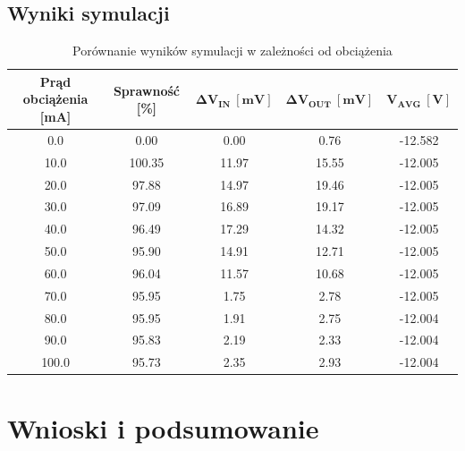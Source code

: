 \documentclass[11pt]{article}
\begin{document}
\subsection{Wyniki symulacji}
\begin{table}[H]
    \centering
    \caption{Porównanie wyników symulacji w zależności od obciążenia}
    \label{tab:efficiency_ripple}
    \begin{tabular}{ccccc}
        \toprule
        \textbf{Prąd obciążenia [mA]} & \textbf{Sprawność [\%]} & $\mathbf{\Delta{V_{IN}} \ [mV]}$ & $\mathbf{\Delta{V_{OUT}} \ [mV]}$ & $\mathbf{V_{AVG} \ [V]}$ \\
        \midrule
        0.0                           & 0.00                    & 0.00                             & 0.76                              & -12.582                  \\
        10.0                          & 100.35                  & 11.97                            & 15.55                             & -12.005                  \\
        20.0                          & 97.88                   & 14.97                            & 19.46                             & -12.005                  \\
        30.0                          & 97.09                   & 16.89                            & 19.17                             & -12.005                  \\
        40.0                          & 96.49                   & 17.29                            & 14.32                             & -12.005                  \\
        50.0                          & 95.90                   & 14.91                            & 12.71                             & -12.005                  \\
        60.0                          & 96.04                   & 11.57                            & 10.68                             & -12.005                  \\
        70.0                          & 95.95                   & 1.75                             & 2.78                              & -12.005                  \\
        80.0                          & 95.95                   & 1.91                             & 2.75                              & -12.004                  \\
        90.0                          & 95.83                   & 2.19                             & 2.33                              & -12.004                  \\
        100.0                         & 95.73                   & 2.35                             & 2.93                              & -12.004                  \\
        \bottomrule
    \end{tabular}
\end{table}

\newpage
\section{Wnioski i podsumowanie}
\end{document}
